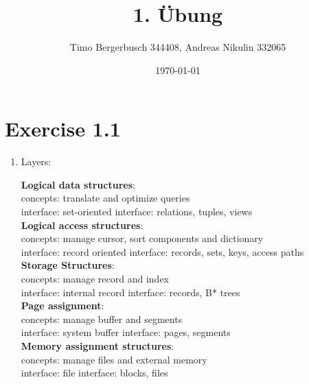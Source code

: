 \documentclass[12pt]{article}
\begin{document}
	
	\title{1. Übung}
	\author{Timo Bergerbusch 344408, Andreas Nikulin 332065}
	\date{\specialdate\today}
	\maketitle
	
	
	\section{Exercise 1.1}
			
	
		 \begin{enumerate}
			\item Layers:\\
			\begin{minipage}{.6\textwidth}
					\textbf{Logical data structures}:\\
					concepts: translate and optimize queries\\
					interface: set-oriented interface: relations, tuples, views \\
					
					\textbf{Logical access structures}:\\
					concepts: manage cursor, sort components and dictionary\\
					interface: record oriented interface: records, sets, keys, access paths\\
					
					\textbf{Storage Structures}:\\
					concepts: manage record and index\\
					interface: internal record interface: records, B* trees\\
					
					\textbf{Page assignment}:\\
					concepts: manage buffer and segments\\
					interface: system buffer interface: pages, segments\\
					
					\textbf{Memory assignment structures}:\\
					concepts: manage files and external memory\\
					interface: file interface: blocks, files\\
					

\end{minipage}
\end{enumerate}
\end{document}
